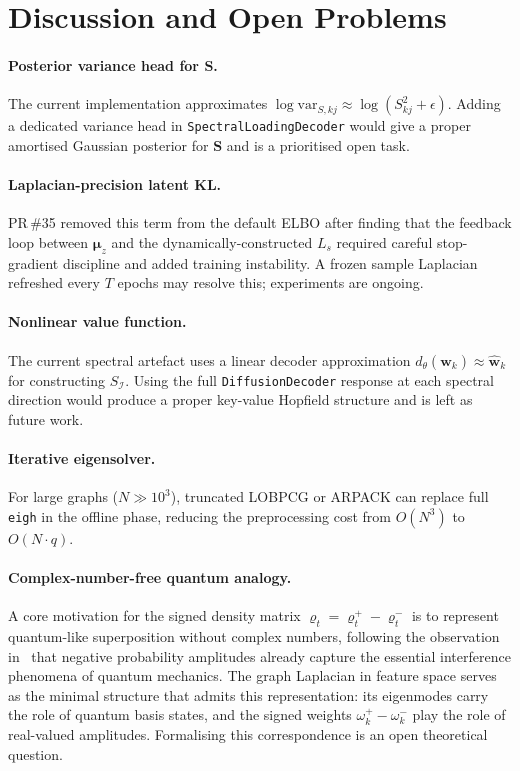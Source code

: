 \documentclass[11pt,a4paper]{article}
\newcommand{\I}{\mathcal{I}}
\newcommand{\bS}{\bm{S}}
\newcommand{\bmu}{\bm{\mu}}
\begin{document}
{%
\section{Discussion and Open Problems}
\label{sec:discussion}

\paragraph{Posterior variance head for $\bS$.}
The current implementation approximates
$\log\mathrm{var}_{S,kj}\approx\log(S_{kj}^2+\epsilon)$.  Adding a dedicated
variance head in \texttt{SpectralLoadingDecoder} would give a proper amortised
Gaussian posterior for $\bS$ and is a prioritised open task.

\paragraph{Laplacian-precision latent KL.}
PR\,\#35 removed this term from the default ELBO after finding that the
feedback loop between $\bmu_z$ and the dynamically-constructed $L_s$
required careful stop-gradient discipline and added training instability.
A frozen sample Laplacian refreshed every $T$ epochs may resolve this;
experiments are ongoing.

\paragraph{Nonlinear value function.}
The current spectral artefact uses a linear decoder approximation
$d_\theta(\hat{\bm{w}}_k)\approx\hat{\bm{w}}_k$ for constructing $S_{\I}$.
Using the full \texttt{DiffusionDecoder} response at each spectral direction
would produce a proper key-value Hopfield structure and is left as future
work.

\paragraph{Iterative eigensolver.}
For large graphs ($N\gg 10^3$), truncated LOBPCG or ARPACK can replace
full \texttt{eigh} in the offline phase, reducing the preprocessing cost
from $O(N^3)$ to $O(N\cdot q)$.

\paragraph{Complex-number-free quantum analogy.}
A core motivation for the signed density matrix $\varrho_t = \varrho_t^+ -
\varrho_t^-$ is to represent quantum-like superposition without complex
numbers, following the observation in~\citet{aaronson2006democritus} that
negative probability amplitudes already capture the essential interference
phenomena of quantum mechanics.  The graph Laplacian in feature space serves
as the minimal structure that admits this representation: its eigenmodes
carry the role of quantum basis states, and the signed weights $\omega_k^+ -
\omega_k^-$ play the role of real-valued amplitudes.  Formalising this
correspondence is an open theoretical question.

}
\end{document}
